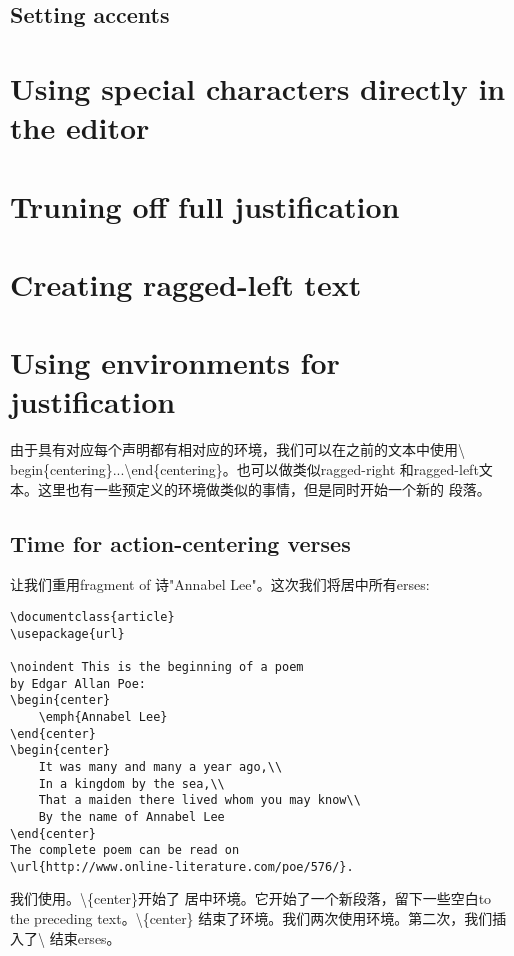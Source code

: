 	\subsection{Setting accents}
\section{Using special characters directly in the editor}
\section{Truning off full justification}
\section{Creating ragged-left text}
\section{Using environments for justification}
由于具有对应每个声明都有相对应的环境，我们可以在之前的文本中使用\textbackslash
begin\{centering\}...\textbackslash end\{centering\}。也可以做类似ragged-right
和ragged-left文本。这里也有一些预定义的环境做类似的事情，但是同时开始一个新的
段落。
\subsection{Time for action-centering verses}
让我们重用fragment of 诗"Annabel Lee"。这次我们将居中所有erses:
\begin{lstlisting}[language={[LaTeX]TeX}]
\documentclass{article}
\usepackage{url}

\noindent This is the beginning of a poem
by Edgar Allan Poe:
\begin{center}
	\emph{Annabel Lee}
\end{center}
\begin{center}
	It was many and many a year ago,\\
	In a kingdom by the sea,\\
	That a maiden there lived whom you may know\\
	By the name of Annabel Lee
\end{center}
The complete poem can be read on
\url{http://www.online-literature.com/poe/576/}.

\end{lstlisting}
我们使用。\textbackslash\{center\}开始了
居中环境。它开始了一个新段落，留下一些空白to the preceding text。\textbackslash \{center\}
结束了环境。我们两次使用环境。第二次，我们插入了\textbackslash {}
结束erses。

